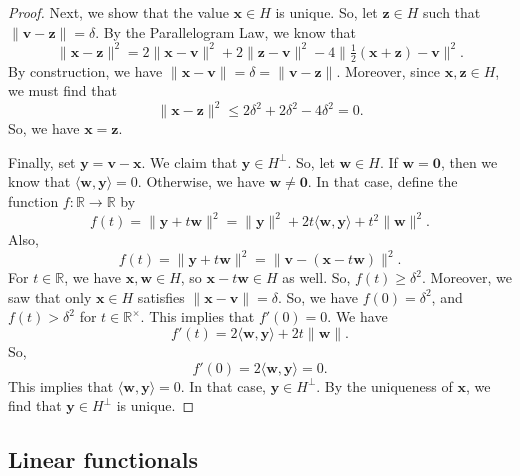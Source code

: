 \documentclass[a4paper, openany]{memoir}
\theoremstyle{definition}
\theoremstyle{plain}
\begin{document}
\begin{proof}
        \noindent Next, we show that the value $\bm{x} \in H$ is unique. So, let $\bm{z} \in H$ such that $\lVert \bm{v} - \bm{z} \rVert = \delta$. By the Parallelogram Law, we know that
        \[\lVert \bm{x} - \bm{z} \rVert^2 = 2\lVert \bm{x} - \bm{v} \rVert^2 + 2\lVert \bm{z} - \bm{v} \rVert^2 - 4 \lVert \tfrac{1}{2}(\bm{x} + \bm{z}) - \bm{v} \rVert^2.\]
        By construction, we have $\lVert \bm{x} - \bm{v} \rVert = \delta = \lVert \bm{v} - \bm{z} \rVert$. Moreover, since $\bm{x}, \bm{z} \in H$, we must find that
        \[\lVert \bm{x} - \bm{z} \rVert^2 \leq 2\delta^2 + 2\delta^2 - 4\delta^2 = 0.\]
        So, we have $\bm{x} = \bm{z}$.

        \noindent Finally, set $\bm{y} = \bm{v} - \bm{x}$. We claim that $\bm{y} \in H^\perp$. So, let $\bm{w} \in H$. If $\bm{w} = \bm{0}$, then we know that $\langle \bm{w}, \bm{y} \rangle = 0$. Otherwise, we have $\bm{w} \neq \bm{0}$. In that case, define the function $f: \mathbb{R} \to \mathbb{R}$ by 
        \[f(t) = \lVert \bm{y} + t \bm{w} \rVert^2 = \lVert \bm{y} \rVert^2 + 2t \langle \bm{w}, \bm{y} \rangle + t^2 \lVert \bm{w} \rVert^2.\]
        Also,
        \[f(t) = \lVert \bm{y} + t\bm{w} \rVert^2 = \lVert \bm{v} - (\bm{x} - t\bm{w}) \rVert^2 .\]
        For $t \in \mathbb{R}$, we have $\bm{x}, \bm{w} \in H$, so $\bm{x} - t\bm{w} \in H$ as well. So, $f(t) \geq \delta^2$. Moreover, we saw that only $\bm{x} \in H$ satisfies $\lVert \bm{x} - \bm{v} \rVert = \delta$. So, we have $f(0) = \delta^2$, and $f(t) > \delta^2$ for $t \in \mathbb{R}^\times$. This implies that $f'(0) = 0$. We have
        \[f'(t) = 2 \langle \bm{w}, \bm{y} \rangle + 2t \lVert \bm{w} \rVert.\]
        So,
        \[f'(0) = 2\langle \bm{w}, \bm{y} \rangle = 0.\]
        This implies that $\langle \bm{w}, \bm{y} \rangle = 0$. In that case, $\bm{y} \in H^\perp$. By the uniqueness of $\bm{x}$, we find that $\bm{y} \in H^\perp$ is unique.
    \end{proof}

    \subsection{Linear functionals}
    
\end{document}
